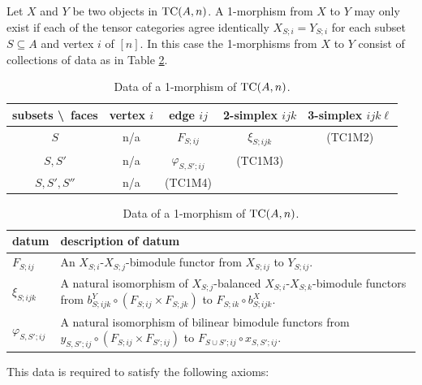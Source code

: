 \documentclass{amsart}
\begin{document}
Let $X$ and $Y$ be two objects in $\mathrm{TC}(A,n)$. A 1-morphism from $X$ to $Y$ may only exist if each of the tensor categories agree identically $X_{S;i} = Y_{S;i}$ for each subset $S \subseteq A$ and vertex $i$ of $[n]$. In this case the 1-morphisms from $X$ to $Y$ consist of collections of data as in Table \ref{Table:1MorOfTC}.
\begin{table}[h]
	\caption{Data of a 1-morphism of $\mathrm{TC}(A,n)$.}
	\begin{tabular}{c |cccc}
	 subsets \textbackslash\ faces & vertex $i$ & edge $ij$ & 2-simplex $ijk$ & 3-simplex $ijk\ell$  \\
	\hline
	$S$ 				& n/a & $F_{S; ij}$ & $\xi_{S; ijk}$  &  (TC1M2) \\
	$S, S'$ 			& n/a & $\varphi_{S, S';ij}$ &  (TC1M3) & \\
	$S, S', S''$ 		& n/a  & (TC1M4) & & \\
	\end{tabular}
	
	\vspace{0.5cm}
	
	\begin{tabular}{l p{11cm}}
		datum & description of datum \\ \hline
		$F_{S;ij}$ & An $X_{S;i}$-$X_{S;j}$-bimodule functor from $X_{S;ij}$ to $Y_{S;ij}$. \\
		$\xi_{S;ijk}$ & A natural isomorphism of $X_{S;j}$-balanced $X_{S;i}$-$X_{S;k}$-bimodule functors from $b^Y_{S;ijk} \circ (F_{S;ij} \times F_{S; jk})$ to $F_{S;ik} \circ b^X_{S;ijk}$. \\
		$\varphi_{S,S'; ij}$ & A natural isomorphism of bilinear bimodule functors from $y_{S,S'; ij} \circ (F_{S; ij} \times F_{S';ij})$ to $F_{S \cup S'; ij} \circ x_{S, S'; ij}$. 
	\end{tabular}
	\label{Table:1MorOfTC}
\end{table}
This data is required to satisfy the following axioms:
\end{document}
